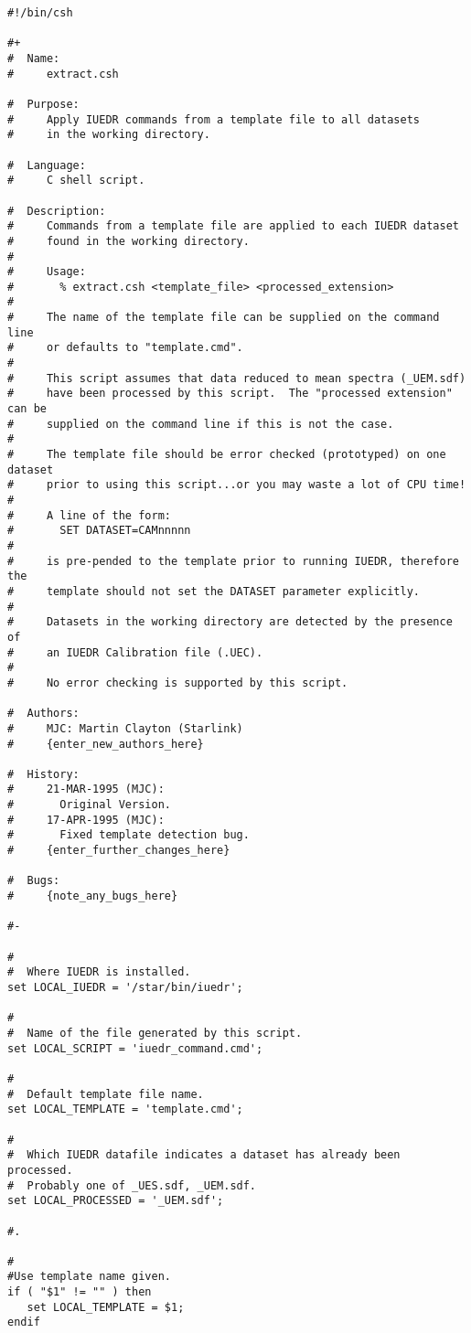 \begin{verbatim}
#!/bin/csh

#+
#  Name:
#     extract.csh

#  Purpose:
#     Apply IUEDR commands from a template file to all datasets
#     in the working directory.

#  Language:
#     C shell script.

#  Description:
#     Commands from a template file are applied to each IUEDR dataset
#     found in the working directory.
#
#     Usage:
#       % extract.csh <template_file> <processed_extension>
#
#     The name of the template file can be supplied on the command line
#     or defaults to "template.cmd".
#
#     This script assumes that data reduced to mean spectra (_UEM.sdf)
#     have been processed by this script.  The "processed extension" can be
#     supplied on the command line if this is not the case.
#
#     The template file should be error checked (prototyped) on one dataset
#     prior to using this script...or you may waste a lot of CPU time!
#
#     A line of the form:
#       SET DATASET=CAMnnnnn
#
#     is pre-pended to the template prior to running IUEDR, therefore the
#     template should not set the DATASET parameter explicitly.
#
#     Datasets in the working directory are detected by the presence of
#     an IUEDR Calibration file (.UEC).
#
#     No error checking is supported by this script.

#  Authors:
#     MJC: Martin Clayton (Starlink)
#     {enter_new_authors_here}

#  History:
#     21-MAR-1995 (MJC):
#       Original Version.
#     17-APR-1995 (MJC):
#       Fixed template detection bug.
#     {enter_further_changes_here}

#  Bugs:
#     {note_any_bugs_here}

#-

#
#  Where IUEDR is installed.
set LOCAL_IUEDR = '/star/bin/iuedr';

#
#  Name of the file generated by this script.
set LOCAL_SCRIPT = 'iuedr_command.cmd';

#
#  Default template file name.
set LOCAL_TEMPLATE = 'template.cmd';

#
#  Which IUEDR datafile indicates a dataset has already been processed.
#  Probably one of _UES.sdf, _UEM.sdf.
set LOCAL_PROCESSED = '_UEM.sdf';

#.

#
#Use template name given.
if ( "$1" != "" ) then
   set LOCAL_TEMPLATE = $1;
endif


\end{verbatim}
